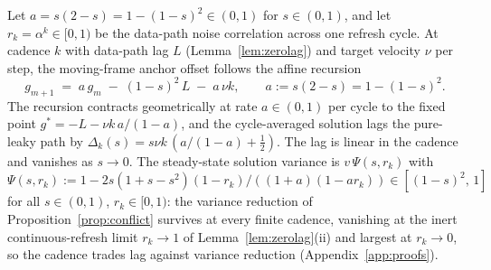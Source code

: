 \documentclass[twoside,11pt]{article}
\begin{document}
\begin{theorem}
\label{thm:cadence}
Let $a = s(2-s) = 1 - (1-s)^2 \in (0,1)$ for $s \in (0,1)$, and let $r_k = \alpha^k \in [0,1)$ be the data-path noise correlation across one refresh cycle.
At cadence $k$ with data-path lag $L$ (Lemma~\ref{lem:zerolag}) and target velocity $\nu$ per step, the moving-frame anchor offset follows the affine recursion
\[
  g_{m+1} \;=\; a\,g_m \;-\; (1-s)^2\,L \;-\; a\,\nu k,
  \qquad a := s(2-s) = 1-(1-s)^2.
\]
The recursion contracts geometrically at rate $a \in (0,1)$ per cycle to the fixed point $g^* = -L - \nu k\,a/(1-a)$, and the cycle-averaged solution lags the pure-leaky path by $\Delta_k(s) = s\nu k\,(a/(1-a) + \tfrac{1}{2})$.
The lag is linear in the cadence and vanishes as $s \to 0$.
The steady-state solution variance is $v\,\Psi(s,r_k)$ with $\Psi(s,r_k) := 1 - 2s(1+s-s^2)(1-r_k)/((1+a)(1-a r_k)) \in [(1-s)^2,\,1]$ for all $s \in (0,1)$, $r_k \in [0,1)$: the variance reduction of Proposition~\ref{prop:conflict} survives at every finite cadence, vanishing at the inert continuous-refresh limit $r_k \to 1$ of Lemma~\ref{lem:zerolag}(ii) and largest at $r_k \to 0$, so the cadence trades lag against variance reduction (Appendix~\ref{app:proofs}).
\end{theorem}
\end{document}
